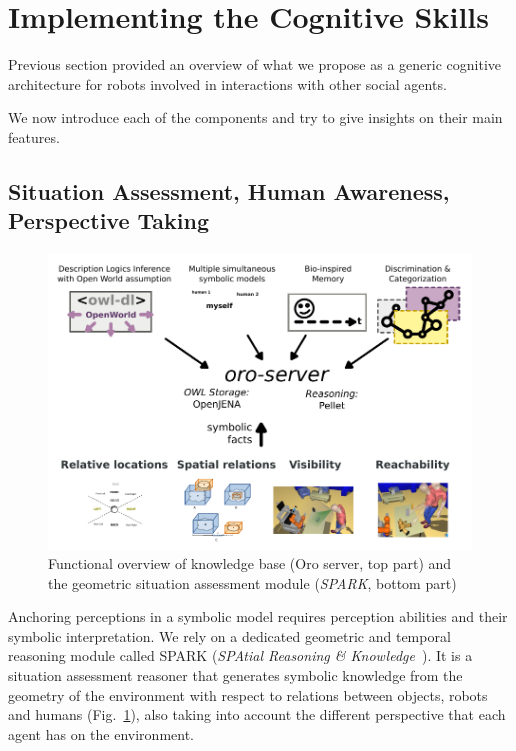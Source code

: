 \documentclass[preprint,12pt]{elsarticle}
\begin{document}
\section{Implementing the Cognitive Skills}

Previous section provided an overview of what we propose as a generic cognitive
architecture for robots involved in interactions with other social agents.

We now introduce each of the components and try to give insights on their main
features.


\subsection{Situation Assessment, Human Awareness, Perspective Taking}
\label{sect|sit-ass}

\begin{figure}
        \centering
        \includegraphics[width=\columnwidth]{spark-oro}
    \caption{Functional overview of knowledge base ({\sc Oro} server, top part) and the geometric situation assessment module (\emph{SPARK}, bottom part)}
        \label{fig|spark-oro}
\end{figure}

Anchoring perceptions in a symbolic model requires perception abilities and
their symbolic interpretation. We rely on a dedicated geometric and temporal
reasoning module called SPARK (\emph{SPAtial Reasoning \&
Knowledge}~\cite{Sisbot2011}). It is a situation assessment reasoner that
generates symbolic knowledge from the geometry of the environment with respect
to relations between objects, robots and humans (Fig.~\ref{fig|spark-oro}),
also taking into account the different perspective that each agent has on the
environment.
\end{document}
